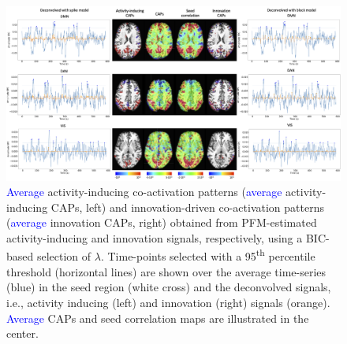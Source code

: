 \begin{figure}[t!]
    \begin{center}
        \includegraphics[width=\textwidth]{figures/caps.png}
    \end{center}
    \caption{\textcolor{blue}{Average} activity-inducing co-activation patterns
    (\textcolor{blue}{average} activity-inducing CAPs, left) and
    innovation-driven co-activation patterns (\textcolor{blue}{average}
    innovation CAPs, right) obtained from PFM-estimated activity-inducing and
    innovation signals, respectively, using a BIC-based selection of $\lambda$.
    Time-points selected with a 95\textsuperscript{th} percentile threshold
    (horizontal lines) are shown over the average time-series (blue) in the seed
    region (white cross) and the deconvolved signals, i.e., activity inducing
    (left) and innovation (right) signals (orange). \textcolor{blue}{Average}
    CAPs and seed correlation maps are illustrated in the center.}
\label{fig:caps}
\end{figure}
